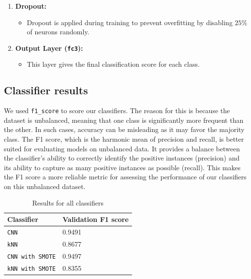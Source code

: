 \documentclass{article}
\begin{document}
\begin{enumerate}
    \item \textbf{Dropout:}
    \begin{itemize}
        \item Dropout is applied during training to prevent overfitting by disabling $25\%$ of neurons randomly.
    \end{itemize}
    
    \item \textbf{Output Layer (\texttt{fc3}):}
    \begin{itemize}
        \item This layer gives the final classification score for each class.
    \end{itemize}
\end{enumerate}

\newpage

\subsection{Classifier results}

We used \texttt{f1\_score} to score our classifiers. The reason for this is because the dataset is unbalanced, meaning that one class is significantly more frequent than the other. In such cases, accuracy can be misleading as it may favor the majority class. The F1 score, which is the harmonic mean of precision and recall, is better suited for evaluating models on unbalanced data. It provides a balance between the classifier's ability to correctly identify the positive instances (precision) and its ability to capture as many positive instances as possible (recall). This makes the F1 score a more reliable metric for assessing the performance of our classifiers on this unbalanced dataset.

\begin{table}[ht]
    \centering
    \begin{tabular}{|l|l|}
        \hline
        \textbf{Classifier} & \textbf{Validation F1 score} \\
        \hline
        \texttt{CNN} & 0.9491 \\
        \hline
        \texttt{kNN} & 0.8677 \\
        \hline
        \texttt{CNN with SMOTE} & 0.9497 \\
        \hline
        \texttt{kNN with SMOTE} & 0.8355 \\
        \hline
    \end{tabular}
    \caption{Results for all classifiers}
\end{table}
\end{document}
